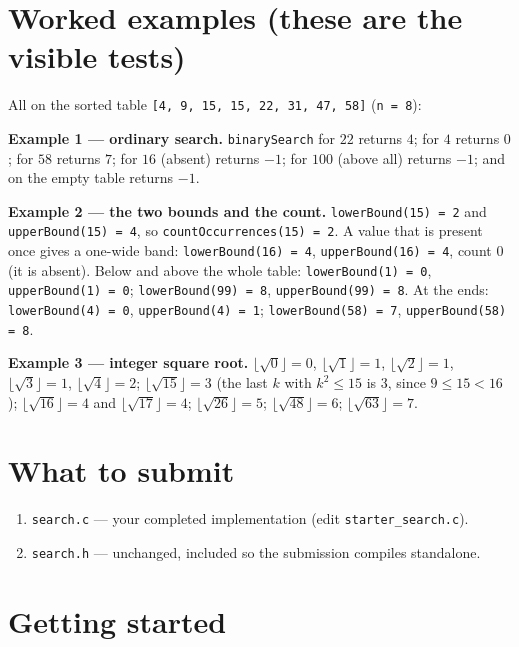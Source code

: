 \documentclass[11pt]{article}
\begin{document}
\section{Worked examples (these are the visible tests)}

All on the sorted table \texttt{[4, 9, 15, 15, 22, 31, 47, 58]} (\texttt{n = 8}):

\textbf{Example 1 --- ordinary search.} \texttt{binarySearch} for $22$ returns $4$; for $4$ returns $0$; for $58$ returns $7$; for $16$ (absent) returns $-1$; for $100$ (above all) returns $-1$; and on the empty table returns $-1$.

\textbf{Example 2 --- the two bounds and the count.} \texttt{lowerBound(15) = 2} and \texttt{upperBound(15) = 4}, so \texttt{countOccurrences(15) = 2}. A value that is present once gives a one-wide band: \texttt{lowerBound(16) = 4}, \texttt{upperBound(16) = 4}, count $0$ (it is absent). Below and above the whole table: \texttt{lowerBound(1) = 0}, \texttt{upperBound(1) = 0}; \texttt{lowerBound(99) = 8}, \texttt{upperBound(99) = 8}. At the ends: \texttt{lowerBound(4) = 0}, \texttt{upperBound(4) = 1}; \texttt{lowerBound(58) = 7}, \texttt{upperBound(58) = 8}.

\textbf{Example 3 --- integer square root.} $\lfloor\sqrt{0}\rfloor = 0$, $\lfloor\sqrt{1}\rfloor = 1$, $\lfloor\sqrt{2}\rfloor = 1$, $\lfloor\sqrt{3}\rfloor = 1$, $\lfloor\sqrt{4}\rfloor = 2$; $\lfloor\sqrt{15}\rfloor = 3$ (the last $k$ with $k^2 \le 15$ is $3$, since $9 \le 15 < 16$); $\lfloor\sqrt{16}\rfloor = 4$ and $\lfloor\sqrt{17}\rfloor = 4$; $\lfloor\sqrt{26}\rfloor = 5$; $\lfloor\sqrt{48}\rfloor = 6$; $\lfloor\sqrt{63}\rfloor = 7$.

\section{What to submit}

\begin{enumerate}
  \item \texttt{search.c} --- your completed implementation (edit \texttt{starter\_search.c}).
  \item \texttt{search.h} --- unchanged, included so the submission compiles standalone.
\end{enumerate}

\section{Getting started}
\end{document}
